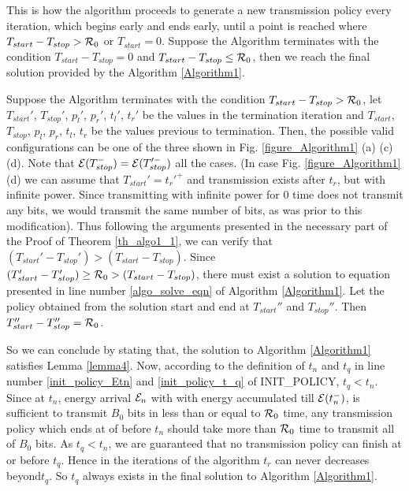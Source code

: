 This is how the algorithm proceeds to generate a new transmission policy every iteration, which begins early and ends early, until a point is reached where $T_{start}-T_{stop}>\mathcal{R}_0$ or $T_{start}=0$. Suppose the Algorithm terminates with the condition $T_{start}-T_{stop}=0$ and $T_{start}-T_{stop}\le\mathcal{R}_0$, then we reach the final solution provided by the Algorithm \ref{Algorithm1}.

Suppose the Algorithm terminates with the condition $T_{start}-T_{stop}>\mathcal{R}_0$, let $T_{start}'$, $T_{stop}'$, $p_l'$, $p_r'$, $t_l'$, $t_r'$ be the values in the termination iteration and $T_{start}$, $T_{stop}$, $p_l$, $p_r$, $t_l$, $t_r$ be the values previous to termination. Then, the possible valid configurations can be one of the three shown in Fig. \ref{figure_Algorithm1} (a) (c) (d). Note that $\mathcal{E}(T_{stop}^-)=\mathcal{E}(T_{stop}'^-)$ all the cases. (In case Fig. \ref{figure_Algorithm1} (d) we can assume that $T_{start}'=t_r'^+$ and transmission exists after $t_r$, but with infinite power. Since transmitting with infinite power for $0$ time does not transmit any bits, we would transmit the same number of bits, as was prior to this modification). Thus following the arguments presented in the necessary part of the Proof of Theorem \ref{th_algo1_1}, we can verify that $(T_{start}'-T_{stop}')>(T_{start}-T_{stop})$. Since $(T_{start}'-T_{stop}')\ge\mathcal{R}_0>(T_{start}-T_{stop})$, there must exist a solution to equation presented in line number \ref{algo_solve_eqn} of Algorithm \ref{Algorithm1}. Let the policy obtained from the solution start and end at $T_{start}''$ and $T_{stop}''$. Then $T_{start}''-T_{stop}''=\mathcal{R}_0$.

So we can conclude by stating that, the solution to Algorithm \ref{Algorithm1} satisfies Lemma \ref{lemma4}. Now, according to the definition of $t_n$ and $t_q$ in line number \ref{init_policy_Etn} and \ref{init_policy_t_q} of INIT\_POLICY, $t_q<t_n$. Since at $t_n$, energy arrival $\mathcal{E}_n$ with with energy accumulated till $\mathcal{E}(t_n^-)$, is sufficient to transmit $B_0$ bits in less than or equal to $\mathcal{R}_0$ time, any transmission policy which ends at of before $t_n$ should take more than $\mathcal{R}_0$ time to transmit all of $B_0$ bits. As $t_q<t_n$, we are guaranteed that no transmission policy can finish at or before $t_q$. Hence in the iterations of the algorithm $t_r$ can never decreases beyond$t_q$. So $t_q$ always exists in the final solution to Algorithm \ref{Algorithm1}.   
\begin{lemma}

\end{lemma}